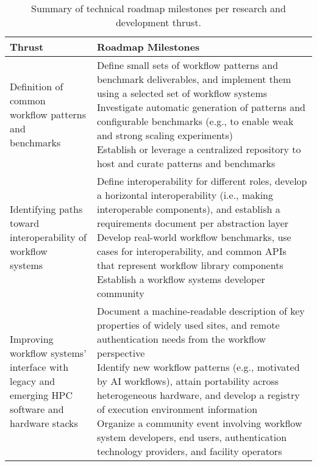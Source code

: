 \begin{table*}[!th]
\centering
\scriptsize
\caption{Summary of technical roadmap milestones per research and development thrust.}
\vspace{-8pt}
\begin{tabular}{p{2.8cm}p{14.4cm}}
\toprule 
Thrust & Roadmap Milestones \\
\midrule
\makecell[l]{Definition of common\\workflow patterns and\\benchmarks} &
\bp{14.4cm}{
    Define small sets of workflow patterns and benchmark deliverables, and implement them using a selected set of workflow systems
    \\
    Investigate automatic generation of patterns and configurable benchmarks (e.g., to enable weak and strong scaling experiments)
    \\
    Establish or leverage a centralized repository to host and curate patterns and benchmarks
}
\\
\midrule

\makecell[l]{Identifying paths toward\\interoperability of workflow\\systems} &
\bp{14.4cm}{
    Define interoperability for different roles, develop a horizontal interoperability (i.e., making interoperable components), and establish a requirements document per abstraction layer
    \\
    Develop real-world workflow benchmarks, use cases for interoperability, and common APIs that represent workflow library components
    \\
    Establish a workflow systems developer community
}
\\
\midrule

\makecell[l]{Improving workflow systems'\\interface with legacy and\\ emerging HPC software and\\hardware stacks} &
\bp{14.4cm}{
    Document a machine-readable description of key properties of widely used sites, and remote authentication needs from the workflow perspective
    \\
    Identify new workflow patterns (e.g., motivated by AI workflows), attain portability across heterogeneous hardware, and develop a registry of execution environment information
    \\
    Organize a community event involving workflow system developers, end users, authentication technology providers, and facility operators
}
\\
\bottomrule
\end{tabular}
\label{tab:roadmap}
\vspace{-10pt}
\end{table*}
